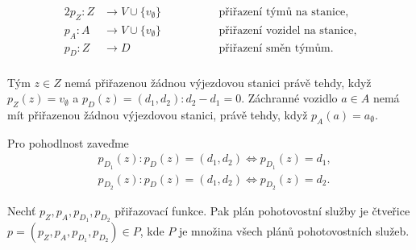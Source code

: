 \begin{definice}
  \begin{alignat*}{2}
    p_Z \colon Z &\rightarrow V \cup \{ v_{\emptyset} \} \quad && \hspace{30pt} \text{přiřazení týmů na stanice}, \\
    p_A \colon A &\rightarrow V \cup \{ v_{\emptyset} \} \quad && \hspace{30pt} \text{přiřazení vozidel na stanice}, \\ 
    p_{D} \colon Z &\rightarrow D                        \quad && \hspace{30pt} \text{přiřazení směn týmům}. \\
  \end{alignat*}

  Tým $z \in Z$ nemá přiřazenou žádnou výjezdovou stanici právě tehdy, když
  $p_{Z}(z) = v_{\emptyset}$ a $p_{D}(z) = (d_1, d_2) \colon d_2 - d_1 = 0$.
  Záchranné vozidlo $a \in A$ nemá mít přiřazenou žádnou výjezdovou stanici, právě tehdy, když $p_{A}(a) = a_{\emptyset}$.

  Pro pohodlnost zaveďme 
  \begin{align*}
    & p_{D_1}(z) \colon p_D(z) = (d_1, d_2) \Leftrightarrow p_{D_1}(z) = d_1, \\
    & p_{D_2}(z) \colon  p_D(z) = (d_1, d_2) \Leftrightarrow p_{D_2}(z) = d_2.
  \end{align*}
\end{definice}

\begin{definice}
  Nechť $p_Z, p_A, p_{D_{1}}, p_{D_{2}}$ přiřazovací funkce.
  Pak plán pohotovostní služby je čtveřice $p = (p_Z, p_A, p_{D_{1}}, p_{D_{2}}) \in P$, kde $P$ je množina všech plánů pohotovostních služeb.
\end{definice}

